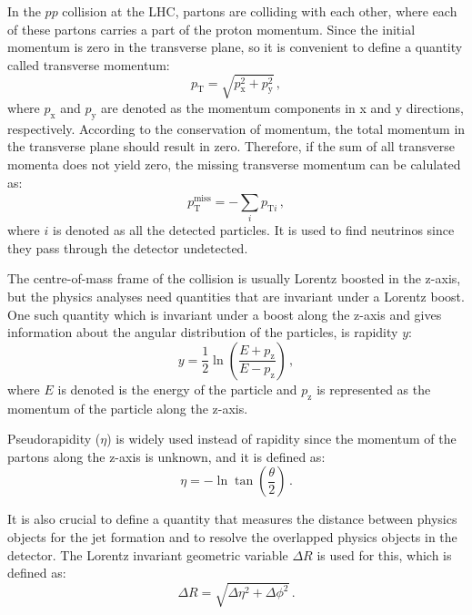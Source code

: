 In the $pp$ collision at the LHC, partons are colliding with each other, where each of these partons carries a part of the proton momentum. Since the initial momentum is zero in the transverse plane, so it is convenient to define a quantity called transverse momentum:
\begin{equation}
	p_{\text{T}} = \sqrt{p_{\text{x}}^{\text{2}} + p_{\text{y}}^{\text{2}}} \,,
\end{equation}
where $p_{\text{x}}$ and $p_{\text{y}}$ are denoted as the momentum components in x and y directions, respectively. According to the conservation of momentum, the total momentum in the transverse plane should result in zero. Therefore, if the sum of all transverse momenta does not yield zero, the missing transverse momentum can be calulated as:
\begin{equation}
	p_{\text{T}}^{\text{miss}} = -\sum_{i}^{}p_{\text{T}i} \,,
\end{equation}
where $i$ is denoted as all the detected particles. It is used to find neutrinos since they pass through the detector undetected.

The centre-of-mass frame of the collision is usually Lorentz boosted in the z-axis, but the physics analyses need quantities that are invariant under a Lorentz boost. One such quantity which is invariant under a boost along the z-axis and gives information about the angular distribution of the particles, is rapidity $y$:
\begin{equation}
	y = \frac{1}{2}\ln(\frac{E+p_{\text{z}}}{E-p_{\text{z}}}) \,,	
\end{equation}
where $E$ is denoted is the energy of the particle and $p_{\text{z}}$ is represented as the momentum of the particle along the z-axis.

Pseudorapidity ($\eta$) is widely used instead of rapidity since the momentum of the partons along the z-axis is unknown, and it is defined as:
\begin{equation}
	\eta = -\ln{\tan(\frac{\theta}{2})} \,.
\end{equation}

It is also crucial to define a quantity that measures the distance between physics objects for the jet formation and to resolve the overlapped physics objects in the detector. The Lorentz invariant geometric variable $\Delta R$ is used for this, which is defined as:
\begin{equation}
	\Delta R = \sqrt{\Delta \eta^{\text{2}} + \Delta \phi^{\text{2}}} \,.
\end{equation}


